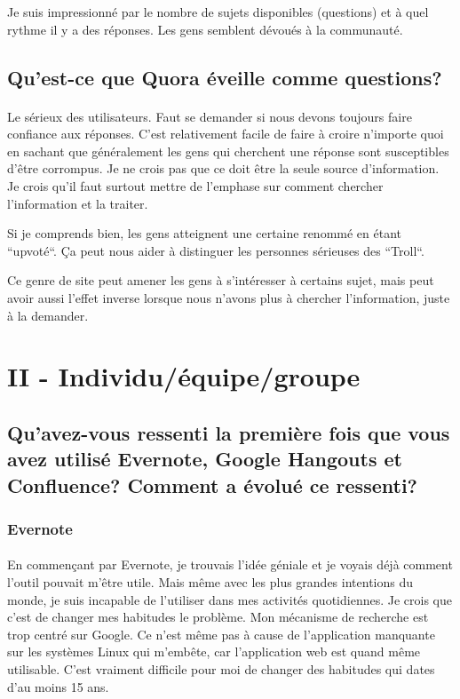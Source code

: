 \documentclass[12pt]{article}
\begin{document}
Je suis impressionné par le nombre de sujets disponibles (questions) et à quel rythme il y a des réponses. Les gens semblent dévoués à la communauté.

\subsection{Qu’est-ce que Quora éveille comme questions?}
\paragraph{}
Le sérieux des utilisateurs. Faut se demander si nous devons toujours faire confiance aux réponses. C'est relativement facile de faire à croire n'importe quoi en sachant que généralement les gens qui cherchent une réponse sont susceptibles d'être corrompus. Je ne crois pas que ce doit être la seule source d'information. Je crois qu'il faut surtout mettre de l'emphase sur comment chercher l'information et la traiter.

Si je comprends bien, les gens atteignent une certaine renommé en étant ``upvoté``. Ça peut nous aider à distinguer les personnes sérieuses des ``Troll``.

Ce genre de site peut amener les gens à s'intéresser à certains sujet, mais peut avoir aussi l'effet inverse lorsque nous n'avons plus à chercher l'information, juste à la demander.

\newpage
\section{II - Individu/équipe/groupe}
\hrulefill

\subsection{Qu’avez-vous ressenti la première fois que vous avez utilisé Evernote, Google Hangouts et Confluence? Comment a évolué ce ressenti?}
\subsubsection{Evernote}
\paragraph{}
En commençant par Evernote, je trouvais l'idée géniale et je voyais déjà comment l'outil pouvait m'être utile. Mais même avec les plus grandes intentions du monde, je suis incapable de l'utiliser dans mes activités quotidiennes. Je crois que c'est de changer mes habitudes le problème. Mon mécanisme de recherche est trop centré sur Google. Ce n'est même pas à cause de l'application manquante sur les systèmes Linux qui m'embête, car l'application web est quand même utilisable. C'est vraiment difficile pour moi de changer des habitudes qui dates d'au moins 15 ans.
\end{document}
